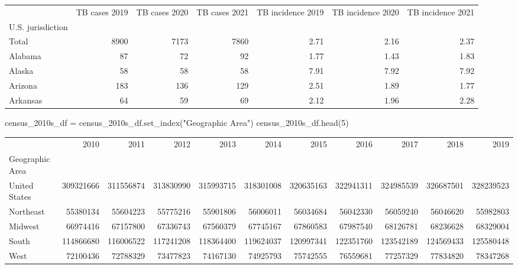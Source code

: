 \documentclass[
  letterpaper,
  DIV=11,
  numbers=noendperiod]{scrreprt}
\newenvironment{Shaded}{\begin{snugshade}}{\end{snugshade}}
\newcommand{\DecValTok}[1]{\textcolor[rgb]{0.68,0.00,0.00}{#1}}
\newcommand{\NormalTok}[1]{\textcolor[rgb]{0.00,0.23,0.31}{#1}}
\newcommand{\OperatorTok}[1]{\textcolor[rgb]{0.37,0.37,0.37}{#1}}
\newcommand{\StringTok}[1]{\textcolor[rgb]{0.13,0.47,0.30}{#1}}
\begin{document}
\begin{tabular}{lrrrrrr}
\toprule
{} &  TB cases 2019 &  TB cases 2020 &  TB cases 2021 &  TB incidence 2019 &  TB incidence 2020 &  TB incidence 2021 \\
U.S. jurisdiction &                &                &                &                    &                    &                    \\
\midrule
Total             &           8900 &           7173 &           7860 &               2.71 &               2.16 &               2.37 \\
Alabama           &             87 &             72 &             92 &               1.77 &               1.43 &               1.83 \\
Alaska            &             58 &             58 &             58 &               7.91 &               7.92 &               7.92 \\
Arizona           &            183 &            136 &            129 &               2.51 &               1.89 &               1.77 \\
Arkansas          &             64 &             59 &             69 &               2.12 &               1.96 &               2.28 \\
\bottomrule
\end{tabular}

\begin{Shaded}
\begin{Highlighting}[]
\NormalTok{census\_2010s\_df }\OperatorTok{=}\NormalTok{ census\_2010s\_df.set\_index(}\StringTok{"Geographic Area"}\NormalTok{)}
\NormalTok{census\_2010s\_df.head(}\DecValTok{5}\NormalTok{)}
\end{Highlighting}
\end{Shaded}

\begin{tabular}{lrrrrrrrrrr}
\toprule
{} &       2010 &       2011 &       2012 &       2013 &       2014 &       2015 &       2016 &       2017 &       2018 &       2019 \\
Geographic Area &            &            &            &            &            &            &            &            &            &            \\
\midrule
United States   &  309321666 &  311556874 &  313830990 &  315993715 &  318301008 &  320635163 &  322941311 &  324985539 &  326687501 &  328239523 \\
Northeast       &   55380134 &   55604223 &   55775216 &   55901806 &   56006011 &   56034684 &   56042330 &   56059240 &   56046620 &   55982803 \\
Midwest         &   66974416 &   67157800 &   67336743 &   67560379 &   67745167 &   67860583 &   67987540 &   68126781 &   68236628 &   68329004 \\
South           &  114866680 &  116006522 &  117241208 &  118364400 &  119624037 &  120997341 &  122351760 &  123542189 &  124569433 &  125580448 \\
West            &   72100436 &   72788329 &   73477823 &   74167130 &   74925793 &   75742555 &   76559681 &   77257329 &   77834820 &   78347268 \\
\bottomrule
\end{tabular}
\end{document}
